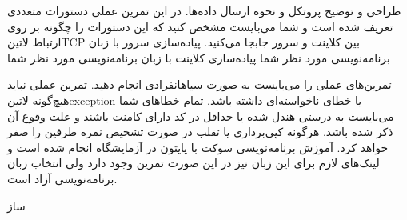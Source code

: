 \documentclass[]{../assignment}
\begin{document}

   طراحی و توضیح پروتکل و نحوه ارسال داده‌ها. در این تمرین عملی دستورات متعددی تعریف شده است و شما می‌بایست مشخص کنید که این دستورات را چگونه بر روی ارتباط ‌لاتین{TCP} بین کلاینت و سرور جابجا می‌کنید.
   پیاده‌سازی سرور با زبان برنامه‌نویسی مورد نظر شما
   پیاده‌سازی کلاینت با زبان برنامه‌نویسی مورد نظر شما


   تمرین‌های عملی را می‌بایست به صورت ‌سیاه{انفرادی} انجام دهید.
   تمرین عملی نباید هیچ‌گونه ‌لاتین{exception} یا خطای ناخواسته‌ای داشته باشد. تمام خطاهای شما می‌بایست به درستی هندل شده یا حداقل در کد دارای کامنت باشند و علت وقوع آن ذکر شده باشد.
   هرگونه کپی‌برداری یا تقلب در صورت تشخیص نمره طرفین را صفر خواهد کرد.
   آموزش برنامه‌نویسی سوکت با پایتون در آزمایشگاه انجام شده است و لینک‌های لازم برای این زبان نیز در این صورت تمرین وجود دارد ولی انتخاب زبان برنامه‌نویسی آزاد است.

  ‌ساز
\end{document}
